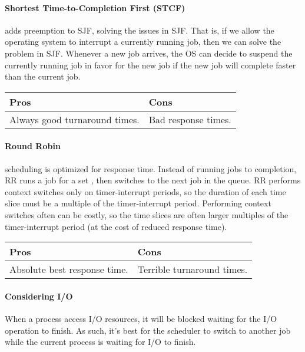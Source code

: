 \paragraph{Shortest Time-to-Completion First (STCF)}
 adds preemption to SJF, solving the issues in SJF. That is, if we allow the operating system to interrupt a currently running job, then we can solve the problem in SJF. Whenever a new job arrives, the OS can decide to suspend the currently running job in favor for the new job if the new job will complete faster than the current job. 

\begin{tabularx}{\linewidth}{| X | X |}
    \hline
    \textbf{Pros} & \textbf{Cons} \\ \hline
    Always good turnaround times.
    &
    Bad response times.
    \\ \hline
\end{tabularx}

\paragraph{Round Robin}
 scheduling is optimized for response time. Instead of running jobs to completion, RR runs a job for a set , then switches to the next job in the queue. RR performs context switches only on timer-interrupt periods, so the duration of each time slice must be a multiple of the timer-interrupt period. Performing context switches often can be costly, so the time slices are often larger multiples of the timer-interrupt period (at the cost of reduced response time).

\begin{tabularx}{\linewidth}{| X | X |}
    \hline
    \textbf{Pros} & \textbf{Cons} \\ \hline
    Absolute best response time.
    &
    Terrible turnaround times.
    \\ \hline
\end{tabularx}

\paragraph{Considering I/O}
When a process access I/O resources, it will be blocked waiting for the I/O operation to finish. As such, it's best for the scheduler to switch to another job while the current process is waiting for I/O to finish.

